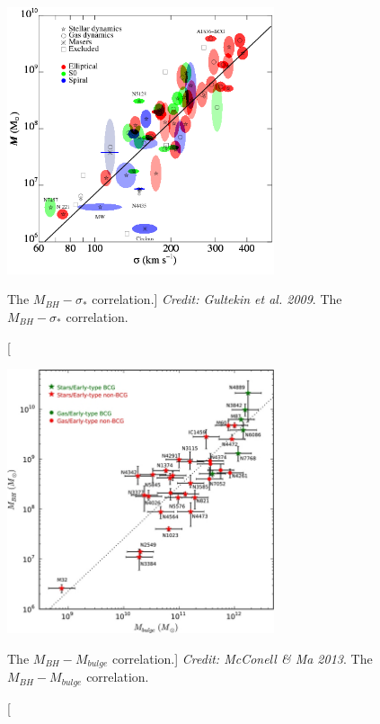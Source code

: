 \begin{figure}
\centering
\includegraphics[width=0.7\textwidth]{figures/02-outflows/msigma.png}
\caption
[The $M_{BH}-\sigma_*$ correlation.]
{
{\sl Credit: Gultekin et al. 2009}. 
The $M_{BH}-\sigma_*$ correlation.
} 
\label{fig:msigma}
\end{figure}

\begin{figure}
\centering
\includegraphics[width=0.7\textwidth]{figures/02-outflows/mbulge.jpg}
\caption
[The $M_{BH}-M_{bulge}$ correlation.]
{
{\sl Credit: McConell \& Ma 2013}. 
The $M_{BH}-M_{bulge}$ correlation.
} 
\label{fig:mbulge}
\end{figure}

